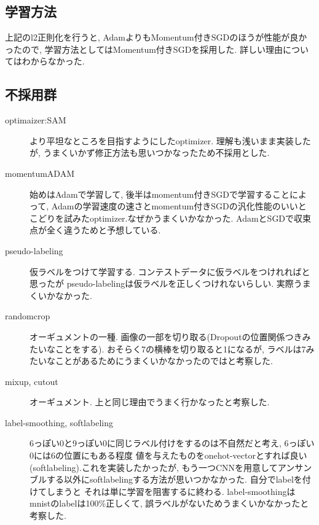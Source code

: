 \documentclass[a4paper,11pt]{jsarticle}
\begin{document}
\subsection{学習方法}
上記のl2正則化を行うと, AdamよりもMomentum付きSGDのほうが性能が良かったので,
学習方法としてはMomentum付きSGDを採用した. 詳しい理由についてはわからなかった.


\subsection{不採用群}
\begin{description}
  \item[optimaizer:SAM] より平坦なところを目指すようにしたoptimizer. 理解も浅いまま実装したが, うまくいかず修正方法も思いつかなったため不採用とした.
    \item[momentumADAM]始めはAdamで学習して, 後半はmomentum付きSGDで学習することによって,
    Adamの学習速度の速さとmomentum付きSGDの汎化性能のいいとこどりを試みたoptimizer.なぜかうまくいかなかった.
    AdamとSGDで収束点が全く違うためと予想している.
  \item[pseudo-labeling] 仮ラベルをつけて学習する. コンテストデータに仮ラベルをつけれればと思ったが
    pseudo-labelingは仮ラベルを正しくつけれないらしい. 実際うまくいかなかった.
  \item[randomcrop] オーギュメントの一種. 画像の一部を切り取る(Dropoutの位置関係つきみたいなことをする).
    おそらく7の横棒を切り取ると1になるが, ラベルは7みたいなことがあるためにうまくいかなかったのではと考察した.
  \item[mixup, cutout] オーギュメント. 上と同じ理由でうまく行かなったと考察した.
  \item[label-smoothing, softlabeling] 6っぽい0と9っぽい0に同じラベル付けをするのは不自然だと考え, 6っぽい0には6の位置にもある程度
    値を与えたものをonehot-vectorとすれば良い(softlabeling).これを実装したかったが,
    もう一つCNNを用意してアンサンブルする以外にsoftlabelingする方法が思いつかなかった. 自分でlabelを付けてしまうと
    それは単に学習を阻害するに終わる. label-smoothingはmnistのlabelは100\%正しくて, 誤ラベルがないためうまくいかなかったと考察した.
\end{description}
\end{document}
